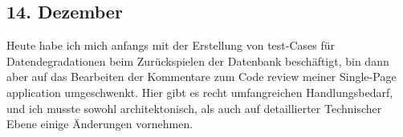 \subsection{14. Dezember}
Heute habe ich mich anfangs mit der Erstellung von test-Cases für Datendegradationen beim Zurückspielen der Datenbank beschäftigt, bin dann aber auf das Bearbeiten der Kommentare zum Code review meiner Single-Page application umgeschwenkt. Hier gibt es recht umfangreichen Handlungsbedarf, und ich musste sowohl architektonisch, als auch auf detaillierter Technischer Ebene einige Änderungen vornehmen.